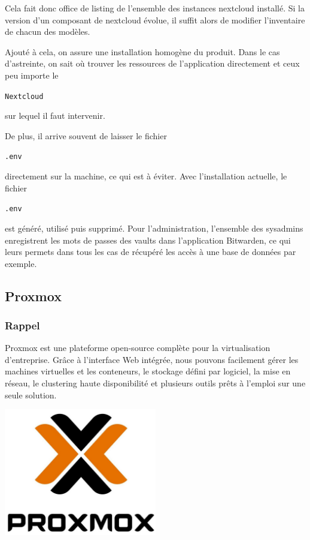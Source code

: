 \documentclass[12pt]{article}
\begin{document}
Cela fait donc office de listing de l'ensemble des instances nextcloud installé. 
Si la version d'un composant de nextcloud évolue, il suffit alors de modifier l'inventaire de chacun des modèles.

Ajouté à cela, on assure une installation homogène du produit. 
Dans le cas d'astreinte, on sait où trouver les ressources de l'application directement et ceux peu importe le \begin{code}\texttt{\gls{Nextcloud}}\end{code} sur lequel il faut intervenir.

De plus, il arrive souvent de laisser le fichier \begin{code}\texttt{.env}\end{code} directement sur la machine, ce qui est à éviter. 
Avec l'installation actuelle, le fichier \begin{code}\texttt{.env}\end{code} est généré, utilisé puis supprimé. 
Pour l'administration, l'ensemble des sysadmins enregistrent les mots de passes des vaults dans l'application Bitwarden, ce qui leurs permets dans tous les cas de récupéré les accès à une base de données par exemple.

\newpage
\subsection{\gls{Proxmox}}
\subsubsection{Rappel}
\noindent%
\begin{minipage}{.7\textwidth}%
\gls{Proxmox} est une plateforme open-source complète pour la virtualisation d'entreprise. 
Grâce à l'interface Web intégrée, nous pouvons facilement gérer les machines virtuelles et les conteneurs, le stockage défini par logiciel, la mise en réseau, le clustering haute disponibilité et plusieurs outils prêts à l'emploi sur une seule solution.

\end{minipage}%
\hfill
\begin{minipage}{.3\textwidth}%
\begin{center}
\includegraphics[width=0.5\textwidth]{src/logo_proxmox.jpg}
\end{center}
\end{minipage}%
\end{document}
